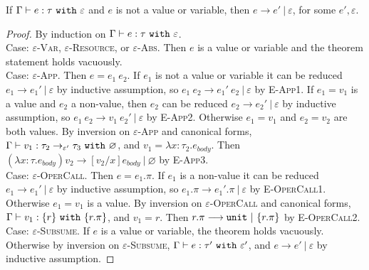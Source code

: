 \documentclass[acmsmall,review,anonymous]{acmart}\settopmatter{printfolios=true}
\begin{document}
\begin{theorem}
If $ \Gamma \vdash  e:  \tau~\mathtt{with}~ \varepsilon$ and $ e$ is not a value or variable, then $ e \longrightarrow  e'~|~\varepsilon$, for some $e', \varepsilon$.
\end{theorem}


\begin{proof} By induction on $ \Gamma \vdash  e:  \tau~\mathtt{with}~ \varepsilon$. \\

Case: \textsc{$\varepsilon$-Var}, \textsc{$\varepsilon$-Resource}, or  \textsc{$\varepsilon$-Abs}. Then $e$ is a value or variable and the theorem statement holds vacuously.\\

Case: \textsc{$\varepsilon$-App}. Then $ e =  e_1~ e_2$. If $ e_1$ is not a value or variable it can be reduced $e_1 \longrightarrow e_1'~|~\varepsilon$ by inductive assumption, so $ e_1~ e_2 \longrightarrow  e_1'~ e_2~|~\varepsilon$ by \textsc{E-App1}. If $ e_1 =  v_1$ is a value and $ e_2$ a non-value, then $e_2$ can be reduced $e_2 \longrightarrow e_2'~|~\varepsilon$ by inductive assumption, so $ e_1~ e_2 \longrightarrow  v_1~ e_2'~|~\varepsilon$ by \textsc{E-App2}. Otherwise $ e_1 = v_1$ and $ e_2 = v_2$ are both values. By inversion on \textsc{$\varepsilon$-App} and canonical forms, $\Gamma \vdash v_1: \tau_2 \rightarrow_{\varepsilon'} \tau_3~\mathtt{with}~ \varnothing$, and $v_1 = \lambda x: \tau_2. e_{body}$. Then $(\lambda x:  \tau.  e_{body})  v_2 \longrightarrow [ v_2/x]e_{body}~|~\varnothing$ by \textsc{E-App3}.\\

Case: \textsc{$\varepsilon$-OperCall}. Then $ e =  e_1.\pi$. If $ e_1$ is a non-value it can be reduced $e_1 \longrightarrow e_1'~|~\varepsilon$ by inductive assumption, so $ e_1.\pi \longrightarrow  e_1'.\pi~|~\varepsilon$ by \textsc{E-OperCall1}. Otherwise $ e_1 =  v_1$ is a value. By inversion on \textsc{$\varepsilon$-OperCall} and canonical forms, $\Gamma \vdash v_1: \{ r \}~\mathtt{with}~ \{ r.\pi \}$, and $v_1 = r$. Then $r.\pi \longrightarrow \mathtt{unit}~|~\{ r.\pi \}$ by \textsc{E-OperCall2}.\\

Case: \textsc{$\varepsilon$-Subsume}. If $e$ is a value or variable, the theorem holds vacuously. Otherwise by inversion on \textsc{$\varepsilon$-Subsume},  $ \Gamma \vdash e:  \tau'~\mathtt{with}~ \varepsilon'$, and $e \longrightarrow e'~|~\varepsilon$ by inductive assumption.

\end{proof}
\end{document}

